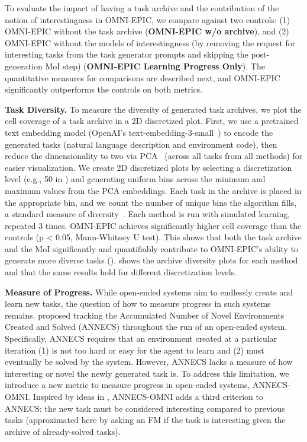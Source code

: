 \documentclass{article} %
\begin{document}
To evaluate the impact of having a task archive and the contribution of the notion of interestingness in OMNI-EPIC, we compare against two controls: (1) OMNI-EPIC without the task archive (\textbf{OMNI-EPIC w/o archive}), and (2) OMNI-EPIC without the models of interestingness (by removing the request for interesting tasks from the task generator prompts and skipping the post-generation MoI step) (\textbf{OMNI-EPIC Learning Progress Only}). The quantitative measures for comparisons are described next, and OMNI-EPIC significantly outperforms the controls on both metrics.

\textbf{Task Diversity.}
To measure the diversity of generated task archives, we plot the cell coverage of a task archive in a 2D discretized plot. First, we use a pretrained text embedding model (OpenAI's text-embedding-3-small~\citep{openai_text_embedding_3_small}) to encode the generated tasks (natural language description and environment code), then reduce the dimensionality to two via PCA~\citep{mackiewicz1993principal} (across all tasks from all methods) for easier visualization. We create 2D discretized plots by selecting a discretization level (e.g., 50 in ) and generating uniform bins across the minimum and maximum values from the PCA embeddings. Each task in the archive is placed in the appropriate bin, and we count the number of unique bins the algorithm fills, a standard measure of diversity~\citep{mouret2015illuminating, pugh2016quality}. Each method is run with simulated learning, repeated 3 times. OMNI-EPIC achieves significantly higher cell coverage than the controls (p < 0.05, Mann-Whitney U test). This shows that both the task archive and the MoI significantly and quantifiably contribute to OMNI-EPIC's ability to generate more diverse tasks ().  shows the archive diversity plots for each method and that the same results hold for different discretization levels.

\textbf{Measure of Progress.}
While open-ended systems aim to endlessly create and learn new tasks, the question of how to measure progress in such systems remains. \citet{wang_EnhancedPOETOpenended_2020} proposed tracking the Accumulated Number of Novel Environments Created and Solved (ANNECS) throughout the run of an open-ended system. Specifically, ANNECS requires that an environment created at a particular iteration (1) is not too hard or easy for the agent to learn and (2) must eventually be solved by the system. However, ANNECS lacks a measure of how interesting or novel the newly generated task is. To address this limitation, we introduce a new metric to measure progress in open-ended systems, ANNECS-OMNI. Inspired by ideas in \citet{zhang_OMNIOpenendednessModels_2023}, ANNECS-OMNI adds a third criterion to ANNECS: the new task must be considered interesting compared to previous tasks (approximated here by asking an FM if the task is interesting given the archive of already-solved tasks).
\end{document}
